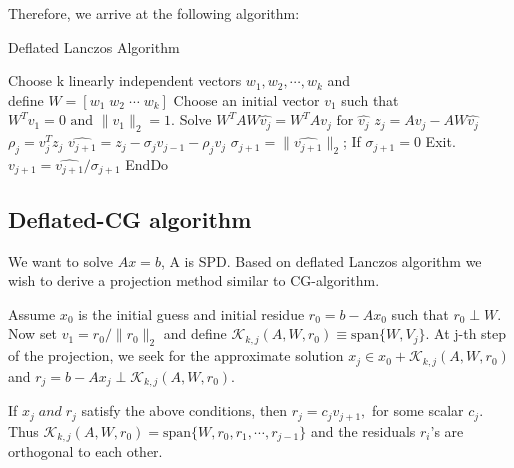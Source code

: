 \documentclass[10pt,a4paper]{article}
\begin{document}
Therefore, we arrive at the following algorithm:

\begin{algorithm}
\caption{Deflated Lanczos Algorithm}
\begin{algorithmic}[1]
\State Choose k linearly independent vectors $w_1,w_2,\cdots,w_k$ and \\ \qquad define $W=[w_1\;w_2\;\cdots\;w_k]$
\State Choose an initial vector $v_1$ such that $W^Tv_1=0\text{ and }\|v_1\|_2=1.$
	\State Solve $W^TAW\hat{v_j}=W^TAv_j\text{ for }\hat{v_j}$
	\State $z_j=Av_j-AW\hat{v_j}$
	\State $\rho_j=v^T_jz_j$
	\State $\hat{v_{j+1}}=z_j-\sigma_jv_{j-1}-\rho_jv_j$
	\State $\sigma_{j+1}=\|\hat{v_{j+1}}\|_2$; If $\sigma_{j+1}=0$ Exit.
	\State $v_{j+1}=\hat{v_{j+1}}/\sigma_{j+1}$
\EndFor
\State EndDo
\end{algorithmic}
\end{algorithm}

\subsection{Deflated-CG algorithm}

We want to solve $Ax=b$, A is SPD. Based on deflated Lanczos algorithm we wish to derive a projection method similar to CG-algorithm. 

Assume $x_0$ is the initial guess and initial residue $r_0=b-Ax_0$ such that $r_0\perp W.$ Now set $v_1=r_0/\|r_0\|_2$ and define $\mathcal{K}_{k,j}(A,W,r_0)\equiv\text{span}\{W,V_j\}$. At j-th step of the projection, we seek for the approximate solution $x_j\in x_0+\mathcal{K}_{k,j}(A,W,r_0)$ and $r_j=b-Ax_j\perp \mathcal{K}_{k,j}(A,W,r_0).$

\begin{lemma}
If $x_j\;and\;r_j$ satisfy the above conditions, then $r_j=c_jv_{j+1},$ for some scalar $c_j$. Thus $\mathcal{K}_{k,j}(A,W,r_0)=\text{span}\{W,r_0,r_1,\cdots,r_{j-1}\}$ and the residuals $r_i$'s are orthogonal to each other.
\end{lemma}
\end{document}
